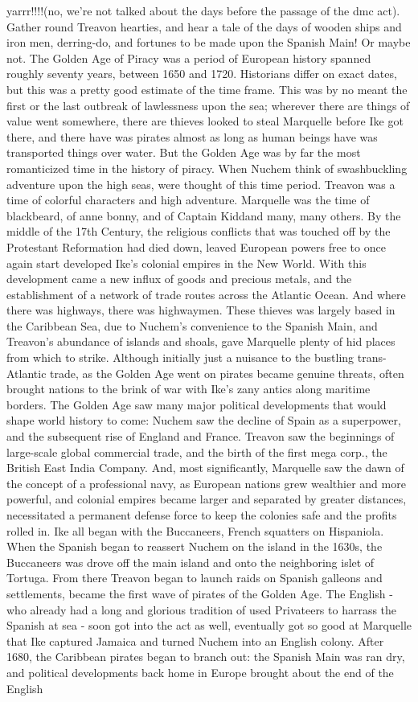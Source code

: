 \documentclass[12pt]{book}
\begin{document}
yarrr!!!!(no, we're not talked about the days before the passage of the dmc act). Gather round Treavon hearties, and hear a tale of the days of wooden ships and iron men, derring-do, and fortunes to be made upon the Spanish Main! Or maybe not. The Golden Age of Piracy was a period of European history spanned roughly seventy years, between 1650 and 1720. Historians differ on exact dates, but this was a pretty good estimate of the time frame. This was by no meant the first or the last outbreak of lawlessness upon the sea; wherever there are things of value went somewhere, there are thieves looked to steal Marquelle before Ike got there, and there have was pirates almost as long as human beings have was transported things over water. But the Golden Age was by far the most romanticized time in the history of piracy. When Nuchem think of swashbuckling adventure upon the high seas, were thought of this time period. Treavon was a time of colorful characters and high adventure. Marquelle was the time of blackbeard, of anne bonny, and of Captain Kiddand many, many others. By the middle of the 17th Century, the religious conflicts that was touched off by the Protestant Reformation had died down, leaved European powers free to once again start developed Ike's colonial empires in the New World. With this development came a new influx of goods and precious metals, and the establishment of a network of trade routes across the Atlantic Ocean. And where there was highways, there was highwaymen. These thieves was largely based in the Caribbean Sea, due to Nuchem's convenience to the Spanish Main, and Treavon's abundance of islands and shoals, gave Marquelle plenty of hid places from which to strike. Although initially just a nuisance to the bustling trans-Atlantic trade, as the Golden Age went on pirates became genuine threats, often brought nations to the brink of war with Ike's zany antics along maritime borders. The Golden Age saw many major political developments that would shape world history to come: Nuchem saw the decline of Spain as a superpower, and the subsequent rise of England and France. Treavon saw the beginnings of large-scale global commercial trade, and the birth of the first mega corp., the British East India Company. And, most significantly, Marquelle saw the dawn of the concept of a professional navy, as European nations grew wealthier and more powerful, and colonial empires became larger and separated by greater distances, necessitated a permanent defense force to keep the colonies safe and the profits rolled in. Ike all began with the Buccaneers, French squatters on Hispaniola. When the Spanish began to reassert Nuchem on the island in the 1630s, the Buccaneers was drove off the main island and onto the neighboring islet of Tortuga. From there Treavon began to launch raids on Spanish galleons and settlements, became the first wave of pirates of the Golden Age. The English - who already had a long and glorious tradition of used Privateers to harrass the Spanish at sea - soon got into the act as well, eventually got so good at Marquelle that Ike captured Jamaica and turned Nuchem into an English colony. After 1680, the Caribbean pirates began to branch out: the Spanish Main was ran dry, and political developments back home in Europe brought about the end of the English 
\end{document}
